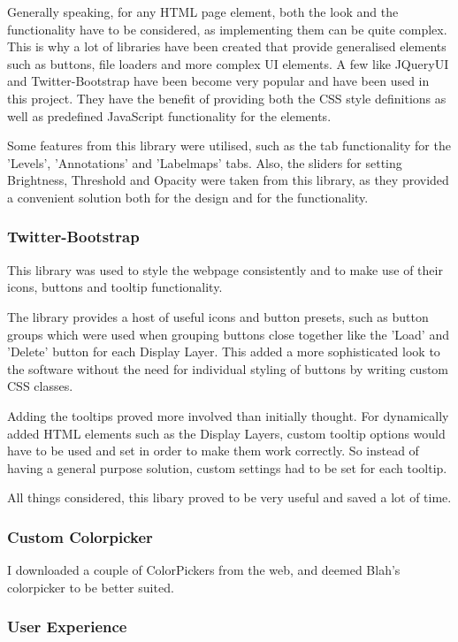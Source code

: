 \documentclass[a4paper,11pt,titlepage]{article}
\begin{document}
Generally speaking, for any HTML page element, both the look and the functionality have to be considered, as implementing them can be quite complex. This is why a lot of libraries have been created that provide generalised elements such as buttons, file loaders and more complex UI elements. A few like JQueryUI and Twitter-Bootstrap have been become very popular and have been used in this project. They have the benefit of providing both the CSS style definitions as well as predefined JavaScript functionality for the elements. 

Some features from this library were utilised, such as the tab functionality for the 'Levels', 'Annotations' and 'Labelmaps' tabs. Also, the sliders for setting Brightness, Threshold and Opacity were taken from this library, as they provided a convenient solution both for the design and for the functionality.


\subsubsection{Twitter-Bootstrap}

This library was used to style the webpage consistently and to make use of their icons, buttons and tooltip functionality.

The library provides a host of useful icons and button presets, such as button groups which were used when grouping buttons close together like the 'Load' and 'Delete' button for each Display Layer. This added a more sophisticated look to the software without the need for individual styling of buttons by writing custom CSS classes.

Adding the tooltips proved more involved than initially thought. For dynamically added HTML elements such as the Display Layers, custom tooltip options would have to be used and set in order to make them work correctly. So instead of having a general purpose solution, custom settings had to be set for each tooltip.

All things considered, this libary proved to be very useful and saved a lot of time.


\subsubsection{Custom Colorpicker}

I downloaded a couple of ColorPickers from the web, and deemed Blah's colorpicker to be better suited.


\subsubsection{User Experience}
\end{document}
